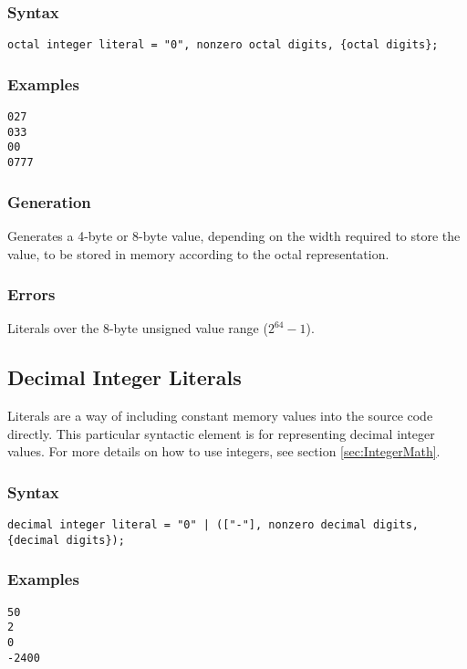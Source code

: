 \documentclass[10pt,a4paper]{article}
\begin{document}
\subsubsection{Syntax}
\begin{verbatim}
octal integer literal = "0", nonzero octal digits, {octal digits};
\end{verbatim}

\subsubsection{Examples}
\begin{verbatim}
027
033
00
0777
\end{verbatim}

\subsubsection{Generation}
Generates a 4-byte or 8-byte value, depending on the width required to store the value, to be stored in memory according to the octal representation. 

\subsubsection{Errors}
Literals over the 8-byte unsigned value range ($2^{64}-1$).

\newpage




\subsection{Decimal Integer Literals}
\label{sec:DecimalIntegerLiterals}
Literals are a way of including constant memory values into the source code directly. This particular syntactic element is for representing decimal integer values. For more details on how to use integers, see section \ref{sec:IntegerMath}.

\subsubsection{Syntax}
\begin{verbatim}
decimal integer literal = "0" | (["-"], nonzero decimal digits, {decimal digits});
\end{verbatim}

\subsubsection{Examples}
\begin{verbatim}
50
2
0
-2400
\end{verbatim}
\end{document}
